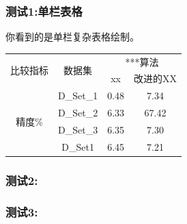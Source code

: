 \documentclass[a4paper,onecolumn,twoside]{article}
\begin{document}
\begin{multicols}{2}
\subsubsection{测试1:单栏表格}
你看到的是单栏复杂表格绘制。\\
        \begin{center}
          \label{tab:tabset2}
          \begin{tabular}{cccc}
            \toprule
            \multirow{2}{*}{比较指标}& \multirow{2}{*}{数据集} &
            \multicolumn{2}{c}{***算法} \\
            \cline{3-4}
         & & xx & 改进的XX \\
            \midrule
            \multirow{4}{*}{精度\%}& D\_Set\_1 & 0.48 & 7.34 \\
            & D\_Set\_2 & 6.33 & 67.42 \\
            & D\_Set\_3 & 6.35& 7.30 \\
            & D\_Set1 & 6.45 & 7.21 \\
            \bottomrule
          \end{tabular}
        \end{center}
\par

\subsubsection{测试2:}
\subsubsection{测试3:}
  \renewcommand\refname{参考文献}
  
  \xiaowuhao{
  
   
  \setlength{\itemsep}{- 2mm}
}

\clearpage
\end{multicols}
\end{document}
